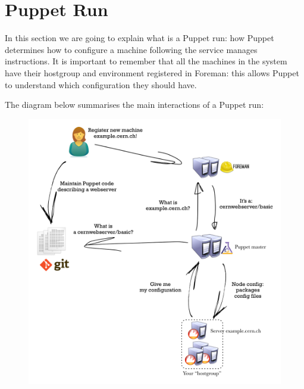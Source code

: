 \section{Puppet Run}

In this section we are going to explain what is a Puppet run: how Puppet
determines how to configure a machine following the service manages
instructions. It is important to remember that all the machines in the
system have their hostgroup and environment registered in Foreman: this
allows Puppet to understand which configuration they should have.

The diagram below summarises the main interactions of a Puppet run:

\begin{figure}[H]
\includegraphics[width=\textwidth,height=\textheight,keepaspectratio]{ConfigurationManagement/PuppetRun/PuppetRun.png}
\end{figure}

